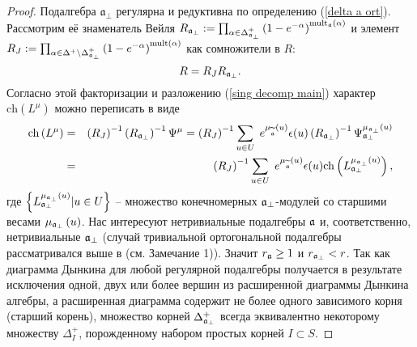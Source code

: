 \begin{proof}
Подалгебра  $\mathfrak{a}_{\bot }$ регулярна и редуктивна по определению  (\ref{delta a ort}). Рассмотрим её знаменатель Вейля   $R_{\frak{a}_{\perp }}:=\prod_{\alpha \in \Delta _{\frak{a}%
_{\perp }}^{+}}\left( 1-e^{-\alpha }\right) ^{\mathrm{mult}_{\frak{a}}%
\mathrm{\left( \alpha \right) }}$ и элемент  $R_{J}:=\prod_{\alpha \in
\Delta ^{+}\setminus \Delta _{\frak{a}_{\perp }}^{+}}\left( 1-e^{-\alpha
}\right) ^{\mathrm{mult}(\alpha )}$ как сомножители в $R$:
\begin{equation*}
R=R_{J}R_{\frak{a}_{\perp }}.
\end{equation*}
Согласно этой факторизации и разложению  (\ref{sing decomp main}) характер $\mathrm{ch}\left( L^{\mu }\right) $ можно переписать в виде
\begin{eqnarray*}
\mathrm{ch}\left( L^{\mu }\right) &=&\left( R_{J}\right) ^{-1}\left( R_{%
\frak{a}_{\perp }}\right) ^{-1}\Psi ^{\mu }=\left( R_{J}\right)
^{-1}\sum_{u\in U}\;e^{\mu _{\widetilde{\frak{a}}}\left( u\right) }\epsilon
(u)\left( R_{\frak{a}_{\perp }}\right) ^{-1}\Psi _{\frak{a}_{\perp }}^{\mu _{%
\frak{a}_{\perp }}\left( u\right) } \\
&=&\left( R_{J}\right) ^{-1}\sum_{u\in U}\;e^{\mu _{\widetilde{\frak{a}}%
}\left( u\right) }\epsilon (u)\mathrm{ch}\left( L_{\frak{a}_{\perp }}^{\mu _{\frak{a}_{\perp
}}\left( u\right) }\right),
\end{eqnarray*}
где  $\left\{ L_{\frak{a}_{\perp }}^{\mu _{\frak{a}_{\perp }}\left(
u\right) }|u\in U\right\} $ -- множество конечномерных $\frak{a}%
_{\perp }$-модулей со старшими весами   $\mu _{\frak{a}_{\perp }}\left(
u\right) $. Нас интересуют нетривиальные подалгебры $\frak{a}$ и, соответственно, нетривиальные  $\frak{a}_{\perp }$ (случай тривиальной ортогональной подалгебры рассматривался выше в (см. Замечание 1)). Значит $r_{\frak{a}}\geq 1$ и $r_{\frak{a}%
_{\perp }}<r$. Так как диаграмма Дынкина для любой регулярной подалгебры получается в результате исключения одной, двух или более вершин из расширенной диаграммы Дынкина алгебры, а расширенная диаграмма содержит не более одного зависимого корня (старший корень), множество корней $\Delta _{\frak{a}_{\perp }}^{+}$ всегда эквивалентно некоторому множеству $\Delta _{I}^{+}$, порожденному набором  простых корней $I\subset S $.


\end{proof}
